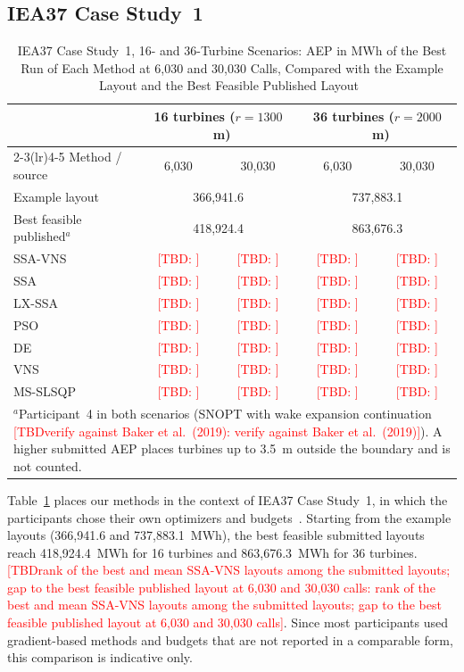 \documentclass[journal,twoside]{IEEEtran}
\newcommand{\TBD}[1]{\textcolor{red}{[TBD\ifx\relax#1\relax\else: #1\fi]}}
\begin{document}
\subsection{IEA37 Case Study~1}
\label{sec:iea37}
\begin{table}[!t]
\centering
\caption{IEA37 Case Study~1, 16- and 36-Turbine Scenarios: AEP in MWh of the Best Run of Each Method at 6,030 and 30,030 Calls, Compared with the Example Layout and the Best Feasible Published Layout~\cite{Baker2019,IEA37repo}}
\label{tab:iea37}
\scriptsize\setlength{\tabcolsep}{2.5pt}
\begin{tabular}{lcccc}
\toprule
& \multicolumn{2}{c}{16 turbines ($r=1300$~m)} & \multicolumn{2}{c}{36 turbines ($r=2000$~m)} \\
\cmidrule(lr){2-3}\cmidrule(lr){4-5}
Method / source & 6,030 & 30,030 & 6,030 & 30,030 \\
\midrule
Example layout & \multicolumn{2}{c}{366,941.6} & \multicolumn{2}{c}{737,883.1} \\
Best feasible published$^{a}$ & \multicolumn{2}{c}{418,924.4} & \multicolumn{2}{c}{863,676.3} \\
\midrule
SSA-VNS & \TBD{} & \TBD{} & \TBD{} & \TBD{} \\
SSA & \TBD{} & \TBD{} & \TBD{} & \TBD{} \\
LX-SSA & \TBD{} & \TBD{} & \TBD{} & \TBD{} \\
PSO & \TBD{} & \TBD{} & \TBD{} & \TBD{} \\
DE & \TBD{} & \TBD{} & \TBD{} & \TBD{} \\
VNS & \TBD{} & \TBD{} & \TBD{} & \TBD{} \\
MS-SLSQP & \TBD{} & \TBD{} & \TBD{} & \TBD{} \\
\bottomrule
\multicolumn{5}{p{0.92\columnwidth}}{$^{a}$Participant~4 in both scenarios (SNOPT with wake expansion continuation \TBD{verify against Baker et al.\ (2019)}). A higher submitted AEP places turbines up to 3.5~m outside the boundary and is not counted.}
\end{tabular}
\end{table}

Table~\ref{tab:iea37} places our methods in the context of IEA37 Case Study~1, in which the participants chose their own optimizers and budgets~\cite{Baker2019}. Starting from the example layouts (366,941.6 and 737,883.1~MWh), the best feasible submitted layouts reach 418,924.4~MWh for 16 turbines and 863,676.3~MWh for 36 turbines. \TBD{rank of the best and mean SSA-VNS layouts among the submitted layouts; gap to the best feasible published layout at 6,030 and 30,030 calls}. Since most participants used gradient-based methods and budgets that are not reported in a comparable form, this comparison is indicative only.
\end{document}
